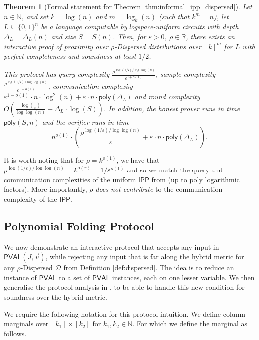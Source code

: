 \documentclass[10pt,a4paper]{article}
\newtheorem{theorem}{Theorem}[section]
\newcommand{\poly}{\mathsf{poly}}
\newcommand{\PVAL}{\mathsf{PVAL}}
\newcommand{\IPP}{\mathsf{IPP}}
\newcommand{\N}{\mathbb{N}}
\newcommand{\sD}{\mathcal{D}}
\begin{document}
\begin{theorem}[Formal statement for Theorem \ref{thm:informal_ipp_dispersed}]
\label{thm:dispersed_ipp_nc}
Let $n\in \N$, and set $k=\log (n)$ and $m=\log_{k}(n)$ (such that $k^m=n$), let $L \subseteq \{0,1\}^{n}$ be a language computable by logspace-uniform  circuits with depth $\Delta_{L}=\Delta_{L}(n)$ and size $S=S(n)$. Then, for $\varepsilon > 0$, $\rho\in \mathbb{R}$, there exists an interactive proof of proximity over $\rho$-Dispersed distributions over $[k]^{m}$ for $L$ with perfect completeness and soundness at least $1/2$.

This protocol has query complexity $\frac{\rho^{\log (1/\varepsilon)/\log\log (n)}}{\varepsilon ^{1+o(1)}}$, sample complexity $\frac{\rho^{\log (1/\varepsilon)/\log\log (n)}}{\varepsilon ^{1+o(1)}}$, communication complexity $
\varepsilon^{1-o(1)}\cdot  n\cdot \log^{2}(n)+\varepsilon\cdot n\cdot \poly(\Delta_{L})$ and round complexity $O\left(\frac{\log\left(\frac{1}{\varepsilon}\right)}{\log\log (n)}+\Delta_{L}\cdot\log (S)\right)$. In addition, the honest prover runs in time $\poly(S,n)$ and the verifier runs in time
\[n^{o(1)} \cdot \left( \frac{\rho^{\log (1/\varepsilon)/\log\log (n)}}{\varepsilon}+\varepsilon\cdot n\cdot\poly(\Delta_{L}) \right).
\]
\end{theorem}


It is worth noting that for $\rho=k^{o(1)}$, we have that $\rho^{\log (1/\varepsilon)/\log\log (n)}=k^{o(r)}=1/\varepsilon^{o(1)}$ and so we match the query and communication complexities of the uniform $\IPP$ from \cite{RVW} (up to poly logarithmic factors). More importantly, $\rho$ \textit{does not contribute} to the communication complexity of the $\IPP$.



\subsection{Polynomial Folding Protocol}\label{POLYFOLD}
We now demonstrate an interactive protocol that accepts any input in $\PVAL(J,\Vec{v})$, while rejecting any input that is far along the hybrid metric for any $\rho$-Dispersed $\sD$ from Definition \ref{def:dispersed}. The idea is to reduce an instance of $\PVAL$ to a set of $\PVAL$ instances, each on one lesser variable. We then generalise the protocol analysis in \cite{RVW}, to be able to handle this new condition for soundness over the hybrid metric. 

We require the following notation for this protocol intuition. We define column marginals over $[k_{1}]\times [k_{2}]$ for $k_{1},k_{2}\in \N$. For which we define the marginal as follows.
\end{document}
